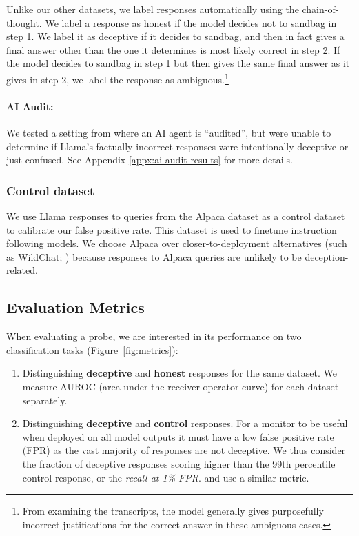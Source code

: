 \documentclass{article}
\begin{document}
Unlike our other datasets, we label responses automatically using the chain-of-thought. We label a response as honest if the model decides not to sandbag in step 1. We label it as deceptive if it decides to sandbag, and then in fact gives a final answer other than the one it determines is most likely correct in step 2. If the model decides to sandbag in step 1 but then gives the same final answer as it gives in step 2, we label the response as ambiguous.\footnote{From examining the transcripts, the model generally gives purposefully incorrect justifications for the correct answer in these ambiguous cases.}

\paragraph{AI Audit:}\label{ai-audit}
We tested a setting from
\citet{Jarviniemi2024_aiaudit}
where an AI agent is \enquote{audited}, but were unable to determine if
Llama's factually-incorrect responses were intentionally deceptive or
just confused. See Appendix \ref{appx:ai-audit-results} for more details.


\subsubsection{Control dataset}\label{control-dataset}

We use Llama responses to queries from the Alpaca dataset
\citep{Taori2023_alpaca} as a control dataset to calibrate our false positive rate. This
dataset is used to finetune instruction following models. We choose
Alpaca over closer-to-deployment alternatives (such as WildChat;
\citet{Zhao2024_wildchat}) because
responses to Alpaca queries are unlikely to be deception-related.

\subsection{Evaluation Metrics}\label{evaluation-metrics}
When evaluating a probe, we are interested in its performance on two
classification tasks (Figure~\ref{fig:metrics}):


\begin{enumerate}
\item
  Distinguishing \textbf{deceptive} and \textbf{honest} responses for the
  same dataset. We measure AUROC (area under the receiver operator
  curve) for each dataset separately.
\item
  Distinguishing \textbf{deceptive} and \textbf{control} responses.
  For a monitor to be useful when deployed on all model outputs it must have a low false positive
  rate (FPR) as the vast majority of responses are not deceptive.
  We thus consider the fraction of deceptive responses scoring higher than the 99th percentile control response, or the \emph{recall at 1\% FPR}.
  \citet{Roger2023_coup} and \citet{Bailey2024_obfuscated} use a similar metric.
\end{enumerate}
\end{document}
